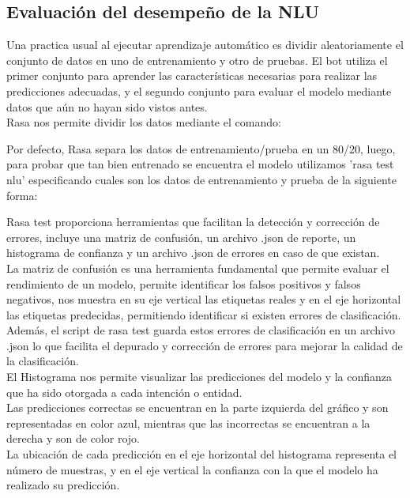 \subsection{Evaluación del desempeño de la NLU}
Una practica usual al ejecutar aprendizaje automático es dividir aleatoriamente el conjunto de datos en uno de entrenamiento y otro de pruebas. El bot utiliza el primer conjunto para aprender las características necesarias para realizar las predicciones adecuadas, y el segundo conjunto para evaluar el modelo mediante datos que aún no hayan sido vistos antes.\\
Rasa nos permite dividir los datos mediante el comando:
\begin{center}
\end{center}
Por defecto, Rasa separa los datos de entrenamiento/prueba en un 80/20, luego, para probar que tan bien entrenado se encuentra el modelo utilizamos 'rasa test nlu' especificando cuales son los datos de entrenamiento y prueba de la siguiente forma:\\
\begin{center}
\end{center}
Rasa test proporciona herramientas que facilitan la detección y corrección de errores, incluye una matriz de confusión, un archivo .json de reporte, un histograma de confianza y un archivo .json de errores en caso de que existan.\\
La matriz de confusión es una herramienta fundamental que permite evaluar el rendimiento de un modelo, permite identificar los falsos positivos y falsos negativos, nos muestra en su eje vertical las etiquetas reales y en el eje horizontal las etiquetas predecidas, permitiendo identificar si existen errores de clasificación.\\
Además, el script de rasa test guarda estos errores de clasificación en un archivo .json lo que facilita el depurado y corrección de errores para mejorar la calidad de la clasificación.\\
El Histograma nos permite visualizar las predicciones del modelo y la confianza que ha sido otorgada a cada intención o entidad.\\
Las predicciones correctas se encuentran en la parte izquierda del gráfico y son representadas en color azul, mientras que las incorrectas se encuentran a la derecha y son de color rojo.\\
La ubicación de cada predicción en el eje horizontal del histograma representa el número de muestras, y en el eje vertical la confianza con la que el modelo ha realizado su predicción.\cite{Interpretación_graficos}

